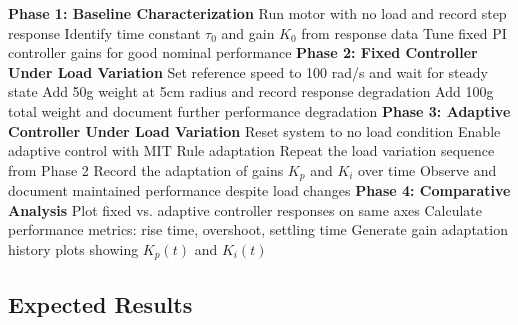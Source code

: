 \begin{algorithm}
\caption{Experimental Procedure for Adaptive Motor Control}
\begin{algorithmic}[1]
\State \textbf{Phase 1: Baseline Characterization}
\State Run motor with no load and record step response
\State Identify time constant $\tau_0$ and gain $K_0$ from response data
\State Tune fixed PI controller gains for good nominal performance
\State
\State \textbf{Phase 2: Fixed Controller Under Load Variation}
\State Set reference speed to 100 rad/s and wait for steady state
\State Add 50g weight at 5cm radius and record response degradation
\State Add 100g total weight and document further performance degradation
\State
\State \textbf{Phase 3: Adaptive Controller Under Load Variation}
\State Reset system to no load condition
\State Enable adaptive control with MIT Rule adaptation
\State Repeat the load variation sequence from Phase 2
\State Record the adaptation of gains $K_p$ and $K_i$ over time
\State Observe and document maintained performance despite load changes
\State
\State \textbf{Phase 4: Comparative Analysis}
\State Plot fixed vs. adaptive controller responses on same axes
\State Calculate performance metrics: rise time, overshoot, settling time
\State Generate gain adaptation history plots showing $K_p(t)$ and $K_i(t)$
\end{algorithmic}
\end{algorithm}

\subsection{Expected Results}

